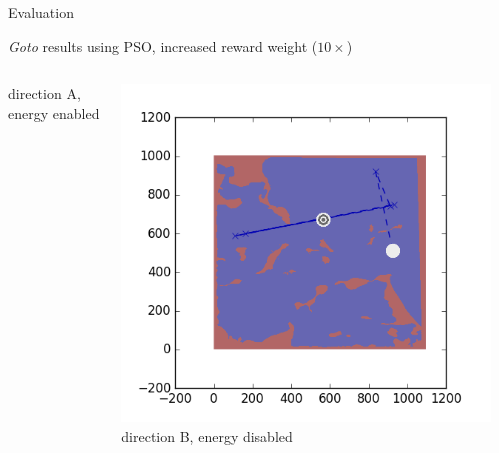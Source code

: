 \documentclass[9pt]{beamer}
\begin{document}
\begin{frame}{Evaluation}
\begin{block}{\textit{Goto} results using PSO, increased reward weight ($10\times$)}
\begin{columns}
\begin{column}{0.25\textwidth}
\begin{center}
                    \newline
                    \tiny{direction A, energy enabled}
                \end{center}
            \end{column}
            \begin{column}{0.25\textwidth}
                \begin{center}
                    \includegraphics[width=\textwidth,trim={2cm 2cm 2cm 2cm},clip]{img/EXP3RG_PathBb_-1_-1_0_0d01.png}
                    \newline
                    \tiny{direction B, energy disabled}
                \end{center}
            \end{column}
            \begin{column}{0.25\textwidth}
                \begin{center}

\end{center}
\end{column}
\end{columns}
\end{block}
\end{frame}
\end{document}
